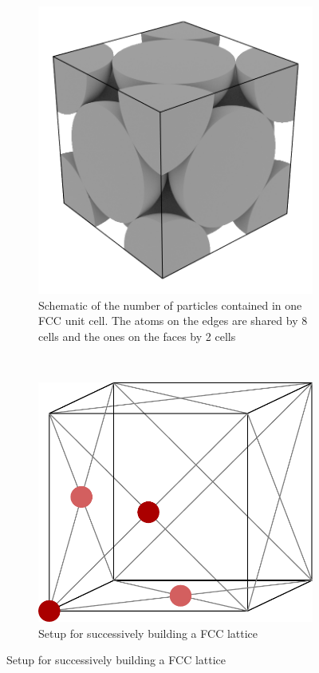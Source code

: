 \documentclass[12pt]{article}
\begin{document}
\begin{figure}[h]
\begin{center}
\begin{subfigure}[t]{0.3\textwidth}
            \includegraphics[scale=0.15]{images/fcc_unit.png}
            \caption{Schematic of the number of particles contained in one FCC unit cell. The atoms on the edges are shared by 8 cells and the ones 
                on the faces by 2 cells\cite{unitcell}}
            \label{fig:fcccut}
        \end{subfigure} 
        \
        \begin{subfigure}[t]{0.3\textwidth}
            \includegraphics[scale=0.3]{images/unit_cell.pdf}
            \caption{Setup for successively building a FCC lattice}
            \label{fig:unitcell}
        \end{subfigure}
    \end{center}
\end{figure}
\end{document}
